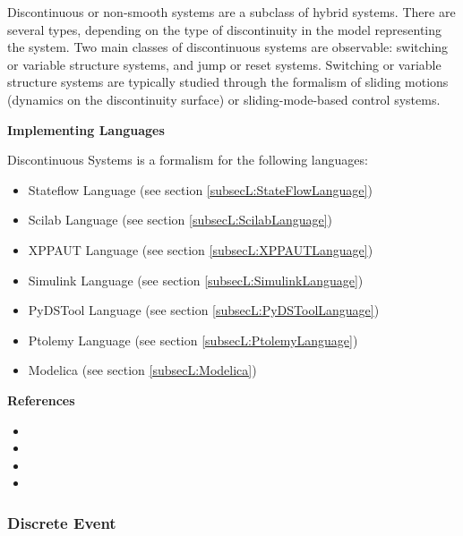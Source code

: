 
Discontinuous or non-smooth systems are a subclass of hybrid systems. There are several types, depending on the type of discontinuity in the model representing the system. Two main classes of discontinuous systems are observable: switching or variable structure systems, and jump or reset systems. Switching or variable structure systems are typically studied through the formalism of sliding motions (dynamics on the discontinuity surface) or sliding-mode-based control systems.

\textbf{Implementing Languages}

Discontinuous Systems is a formalism for the following languages:
\begin{itemize}
	\item Stateflow Language (see section \ref{subsecL:StateFlowLanguage})
	\item Scilab Language (see section \ref{subsecL:ScilabLanguage})
	\item XPPAUT Language (see section \ref{subsecL:XPPAUTLanguage})
	\item Simulink Language (see section \ref{subsecL:SimulinkLanguage})
	\item PyDSTool Language (see section \ref{subsecL:PyDSToolLanguage})
	\item Ptolemy Language (see section \ref{subsecL:PtolemyLanguage})
	\item Modelica (see section \ref{subsecL:Modelica})
\end{itemize}





\textbf{References}
\begin{itemize}
	
\item {}
	
\item {}
	
\item {}
	
\item {}
\end{itemize}



\subsubsection{Discrete Event}
\label{subsecF:DiscreteEvent}

